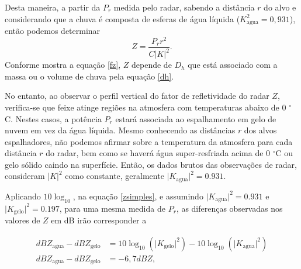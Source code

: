 Desta maneira, a partir da $P_r$ medida pelo radar, sabendo a distância $r$ do alvo e considerando que a chuva é composta de esferas de água líquida ($K_{\mathrm{agua}}^2=0,931$), então podemos determinar 
\begin{equation}
Z = \dfrac{P_r r^2}{C |K|^2}.
\label{zsimples}
\end{equation}
Conforme mostra a equação \ref{fz}, $Z$ depende de $D_h$ que está associado com a massa ou o volume de chuva pela equação \ref{dh}.


No entanto, ao observar o perfil vertical do fator de refletividade do radar $Z$, verifica-se que feixe atinge regiões na atmosfera com temperaturas abaixo de 0 $^{\circ}$C. Nestes casos, a potência $P_r$ estará associada ao espalhamento em gelo de nuvem em vez da água líquida. Mesmo conhecendo as distâncias $r$ dos alvos espalhadores, não podemos afirmar sobre a temperatura da atmosfera para cada distância $r$ do radar, bem como se haverá água super-resfriada acima de 0 $^{\circ}$C ou gelo sólido caindo na superfície. Então, os dados brutos das observações de radar, consideram $|K|^2$ como constante, geralmente $\vert K_{\mathrm{agua}}\vert^2 = 0.931$. 


Aplicando $10\log_{10}$, na equação \ref{zsimples}, e assumindo  $\vert K_{\mathrm{agua}}\vert^2 = 0.931$ e $\vert K_{\mathrm{gelo}}\vert^2= 0.197$, para uma mesma medida de $P_r$, as diferenças observadas nos valores de $Z$ em dB irão corresponder a

\begin{align}
dBZ_{\mathrm{agua}}-dBZ_{\mathrm{gelo}} &=  10\log_{10}(\vert K_{\mathrm{gelo}}\vert^2 ) - 10\log_{10}(\vert K_{\mathrm{agua}}\vert^2)\\
dBZ_{\mathrm{agua}}- dBZ_{\mathrm{gelo}} &= -6,7 dBZ,
\end{align}

